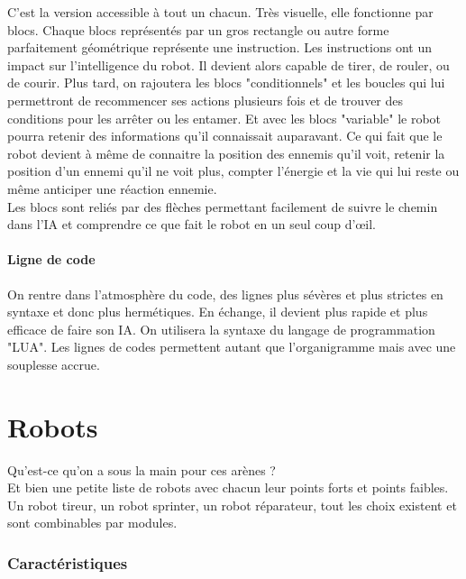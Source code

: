 \documentclass[10pt]{article}
\begin{document}
C'est la version accessible à tout un chacun. Très visuelle, elle fonctionne par blocs. Chaque blocs représentés par un gros rectangle ou autre forme parfaitement géométrique représente une instruction. Les instructions ont un impact sur l'intelligence du robot. Il devient alors capable de tirer, de rouler, ou de courir. Plus tard, on rajoutera les blocs "conditionnels" et les boucles qui lui permettront de recommencer ses actions plusieurs fois et de trouver des conditions pour les arrêter ou les entamer. Et avec les blocs "variable" le robot pourra retenir des informations qu'il connaissait auparavant.
Ce qui fait que le robot devient à même de connaitre la position des ennemis qu'il voit, retenir la position d'un ennemi qu'il ne voit plus, compter l'énergie et la vie qui lui reste ou même anticiper une réaction ennemie.\\
Les blocs sont reliés par des flèches permettant facilement de suivre le chemin dans l'IA et comprendre ce que fait le robot en un seul coup d'œil.

\subsection*{Ligne de code}

On rentre dans l'atmosphère du code, des lignes plus sévères et plus strictes en syntaxe et donc plus hermétiques. En échange, il devient plus rapide et plus efficace de faire son IA. On utilisera la syntaxe du langage de programmation "LUA". Les lignes de codes permettent autant que l'organigramme mais avec une souplesse accrue.




\newpage
\setcounter{section}{0}
\part{Robots}

Qu'est-ce qu'on a sous la main pour ces arènes ?\\
Et bien une petite liste de robots avec chacun leur points forts et points faibles. Un robot tireur, un robot sprinter, un robot réparateur, tout les choix existent et sont combinables par modules.

\section{Caractéristiques}
\end{document}
